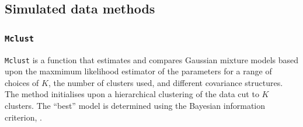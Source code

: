 \documentclass{bioinfo}
\begin{document}
\subsection{Simulated data methods}

\subsubsection{\texttt{Mclust}}
\texttt{Mclust} \citep{mclust2016scrucca} is a function that estimates and compares Gaussian mixture models based upon the maxmimum likelihood estimator of the parameters for a range of choices of $K$, the number of clusters used, and different covariance structures. The method initialises upon a hierarchical clustering of the data cut to $K$ clusters. The ``best'' model is determined using the Bayesian information criterion, \citep[][]{schwarz1978estimating}.
\end{document}
